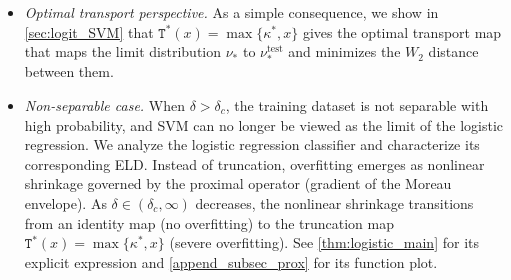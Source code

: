 \begin{itemize}
\item \textit{Optimal transport perspective.} As a simple consequence, we show in \cref{sec:logit_SVM} that $\mathtt{T}^*(x) = \max\{\kappa^*, x \}$ gives the optimal transport map that maps the limit distribution $\nu_*$ to $\nu_*^\mathrm{test}$ and minimizes the $W_2$ distance between them.

\item \textit{Non-separable case.} When $\delta > \delta_c$, the training dataset is not separable with high probability, and SVM can no longer be viewed as the limit of the logistic regression. We analyze the logistic regression classifier and characterize its corresponding ELD. Instead of truncation, overfitting emerges as nonlinear shrinkage governed by the proximal operator (gradient of the Moreau envelope). As $\delta \in (\delta_c, \infty)$ decreases, the nonlinear shrinkage transitions from an identity map (no overfitting) to the truncation map $\mathtt{T}^*(x) = \max\{\kappa^*, x \}$ (severe overfitting). See \cref{thm:logistic_main} for its explicit expression and \cref{append_subsec_prox} for its function plot.
\end{itemize}


